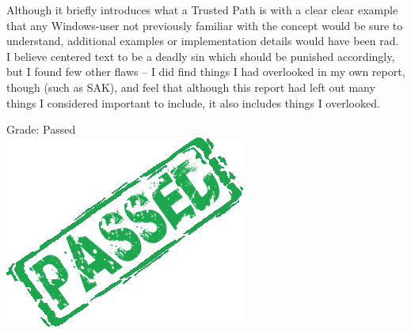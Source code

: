 Although it briefly introduces what a Trusted Path is with a clear clear example that any Windows-user not previously familiar with the concept would be sure to understand, additional examples or implementation details would have been rad.
I believe centered text to be a deadly sin which should be punished accordingly, but I found few other flaws -- I did find things I had overlooked in my own report, though (such as SAK), and feel that although this report had left out many things I considered important to include, it also includes things I overlooked.



Grade: Passed\\

\vspace*{2cm}
\hspace*{4cm}
\includegraphics[scale=1]{pat.png}